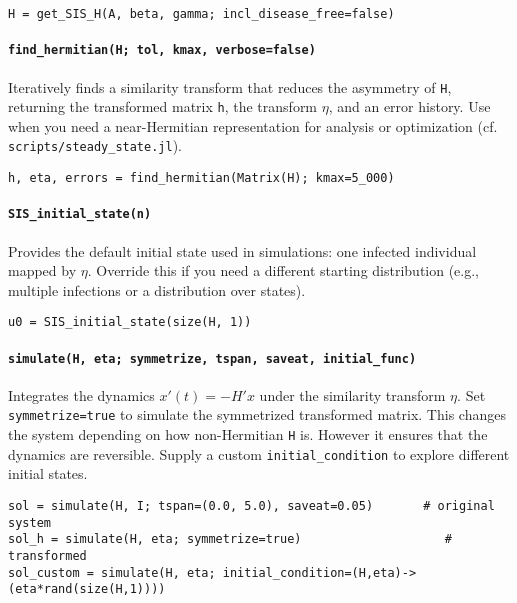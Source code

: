\documentclass[11pt]{article}
\newcommand{\code}[1]{\texttt{#1}}
\begin{document}
\begin{Verbatim}[fontsize=\small]
H = get_SIS_H(A, beta, gamma; incl_disease_free=false)
\end{Verbatim}

\paragraph{\code{find\_hermitian(H; tol, kmax, verbose=false)}} Iteratively finds a similarity transform that reduces the asymmetry of \code{H}, returning the transformed matrix \code{h}, the transform \(\eta\), and an error history.
Use when you need a near-Hermitian representation for analysis or optimization (cf. \code{scripts/steady\_state.jl}).

\begin{Verbatim}[fontsize=\small]
h, eta, errors = find_hermitian(Matrix(H); kmax=5_000)
\end{Verbatim}

\paragraph{\code{SIS\_initial\_state(n)}} Provides the default initial state used in simulations: one infected individual mapped by \(\eta\).
Override this if you need a different starting distribution (e.g., multiple infections or a distribution over states).

\begin{Verbatim}[fontsize=\small]
u0 = SIS_initial_state(size(H, 1))
\end{Verbatim}

\paragraph{\code{simulate(H, eta; symmetrize, tspan, saveat, initial\_func)}} Integrates the dynamics \(x'(t) = -H' x\) under the similarity transform \(\eta\).
Set \code{symmetrize=true} to simulate the symmetrized transformed matrix.
This changes the system depending on how non-Hermitian \code{H} is.
However it ensures that the dynamics are reversible.
Supply a custom \code{initial\_condition} to explore different initial states.

\begin{Verbatim}[fontsize=\small]
sol = simulate(H, I; tspan=(0.0, 5.0), saveat=0.05)       # original system
sol_h = simulate(H, eta; symmetrize=true)                    # transformed
sol_custom = simulate(H, eta; initial_condition=(H,eta)->(eta*rand(size(H,1))))
\end{Verbatim}
\end{document}
